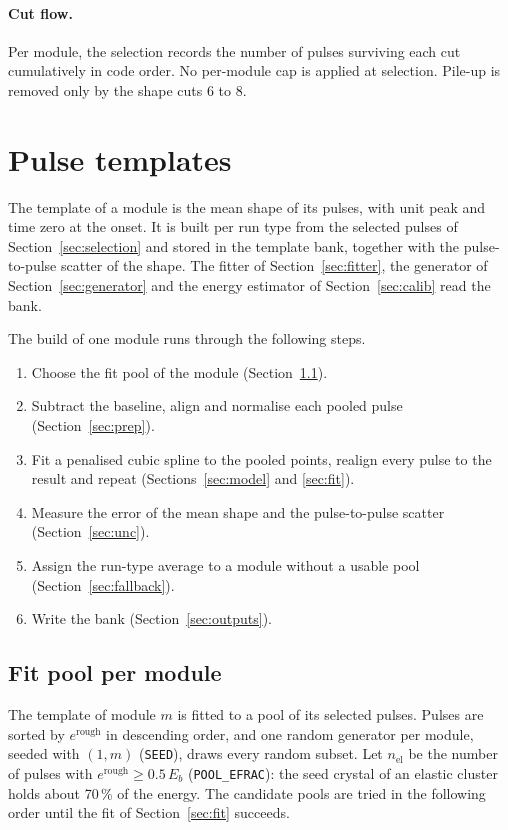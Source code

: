 \documentclass[11pt]{article}
\newcommand{\code}[1]{\texttt{#1}}
\begin{document}
\paragraph{Cut flow.} Per module, the selection records the number of pulses surviving each cut cumulatively in code order. No per-module cap is applied at selection. Pile-up is removed only by the shape cuts 6 to 8.

\section{Pulse templates}
\label{sec:templates}

The template of a module is the mean shape of its pulses, with unit peak and time zero at the onset. It is built per run type from the selected pulses of Section~\ref{sec:selection} and stored in the template bank, together with the pulse-to-pulse scatter of the shape. The fitter of Section~\ref{sec:fitter}, the generator of Section~\ref{sec:generator} and the energy estimator of Section~\ref{sec:calib} read the bank.

The build of one module runs through the following steps.
\begin{enumerate}
\item Choose the fit pool of the module (Section~\ref{sec:pools}).
\item Subtract the baseline, align and normalise each pooled pulse (Section~\ref{sec:prep}).
\item Fit a penalised cubic spline to the pooled points, realign every pulse to the result and repeat (Sections~\ref{sec:model} and \ref{sec:fit}).
\item Measure the error of the mean shape and the pulse-to-pulse scatter (Section~\ref{sec:unc}).
\item Assign the run-type average to a module without a usable pool (Section~\ref{sec:fallback}).
\item Write the bank (Section~\ref{sec:outputs}).
\end{enumerate}

\subsection{Fit pool per module}
\label{sec:pools}

The template of module $m$ is fitted to a pool of its selected pulses. Pulses are sorted by $e^{\mathrm{rough}}$ in descending order, and one random generator per module, seeded with $(1, m)$ (\code{SEED}), draws every random subset. Let $n_{\mathrm{el}}$ be the number of pulses with $e^{\mathrm{rough}} \ge 0.5\,E_b$ (\code{POOL\_EFRAC}): the seed crystal of an elastic cluster holds about 70\,\% of the energy. The candidate pools are tried in the following order until the fit of Section~\ref{sec:fit} succeeds.
\end{document}
